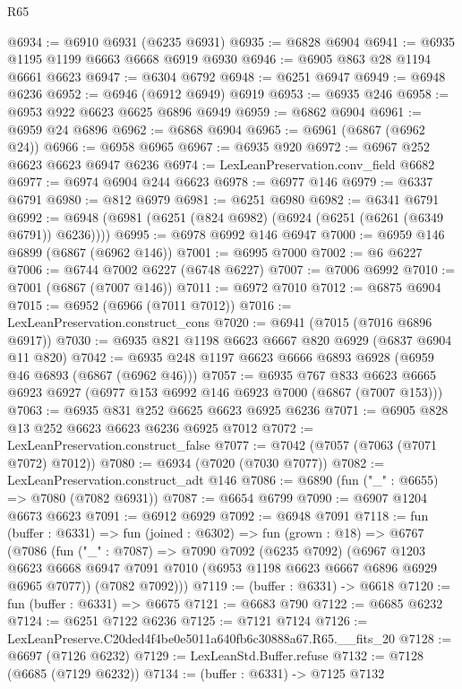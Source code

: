 \begin{lexlean}{R65}
\begin{coremodule}
{@6934 := @6910 @6931 (@6235 @6931)
@6935 := @6828 @6904
@6941 := @6935 @1195 @1199 @6663 @6668 @6919 @6930
@6946 := @6905 @863 @28 @1194 @6661 @6623
@6947 := @6304 @6792
@6948 := @6251 @6947
@6949 := @6948 @6236
@6952 := @6946 (@6912 @6949) @6919
@6953 := @6935 @246
@6958 := @6953 @922 @6623 @6625 @6896 @6949
@6959 := @6862 @6904
@6961 := @6959 @24 @6896
@6962 := @6868 @6904
@6965 := @6961 (@6867 (@6962 @24))
@6966 := @6958 @6965
@6967 := @6935 @920
@6972 := @6967 @252 @6623 @6623 @6947 @6236
@6974 := LexLeanPreservation.conv_field @6682
@6977 := @6974 @6904 @244 @6623
@6978 := @6977 @146
@6979 := @6337 @6791
@6980 := @812 @6979
@6981 := @6251 @6980
@6982 := @6341 @6791
@6992 := @6948 (@6981 (@6251 (@824 @6982) (@6924 (@6251 (@6261 (@6349 @6791)) @6236))))
@6995 := @6978 @6992 @146 @6947
@7000 := @6959 @146 @6899 (@6867 (@6962 @146))
@7001 := @6995 @7000
@7002 := @6 @6227
@7006 := @6744 @7002 @6227 (@6748 @6227)
@7007 := @7006 @6992
@7010 := @7001 (@6867 (@7007 @146))
@7011 := @6972 @7010
@7012 := @6875 @6904
@7015 := @6952 (@6966 (@7011 @7012))
@7016 := LexLeanPreservation.construct_cons
@7020 := @6941 (@7015 (@7016 @6896 @6917))
@7030 := @6935 @821 @1198 @6623 @6667 @820 @6929 (@6837 @6904 @11 @820)
@7042 := @6935 @248 @1197 @6623 @6666 @6893 @6928 (@6959 @46 @6893 (@6867 (@6962 @46)))
@7057 := @6935
    @767
    @833
    @6623
    @6665
    @6923
    @6927
    (@6977 @153 @6992 @146 @6923 @7000 (@6867 (@7007 @153)))
@7063 := @6935 @831 @252 @6625 @6623 @6925 @6236
@7071 := @6905 @828 @13 @252 @6623 @6623 @6236 @6925 @7012
@7072 := LexLeanPreservation.construct_false
@7077 := @7042 (@7057 (@7063 (@7071 @7072) @7012))
@7080 := @6934 (@7020 (@7030 @7077))
@7082 := LexLeanPreservation.construct_adt @146
@7086 := @6890 (fun ("_" : @6655) => @7080 (@7082 @6931))
@7087 := @6654 @6799
@7090 := @6907 @1204 @6673 @6623
@7091 := @6912 @6929
@7092 := @6948 @7091
@7118 := fun (buffer : @6331) =>
  fun (joined : @6302) =>
  fun (grown : @18) =>
  @6767
    (@7086
      (fun ("_" : @7087) =>
      @7090
        @7092
        (@6235 @7092)
        (@6967
          @1203
          @6623
          @6668
          @6947
          @7091
          @7010
          (@6953 @1198 @6623 @6667 @6896 @6929 @6965 @7077))
        (@7082 @7092)))
@7119 := (buffer : @6331) -> @6618
@7120 := fun (buffer : @6331) => @6675
@7121 := @6683 @790
@7122 := @6685 @6232
@7124 := @6251 @7122 @6236
@7125 := @7121 @7124
@7126 := LexLeanPreserve.C20ded4f4be0e5011a640fb6c30888a67.R65.__fits_20
@7128 := @6697 (@7126 @6232)
@7129 := LexLeanStd.Buffer.refuse
@7132 := @7128 (@6685 (@7129 @6232))
@7134 := (buffer : @6331) -> @7125 @7132
}
\end{coremodule}
\end{lexlean}
